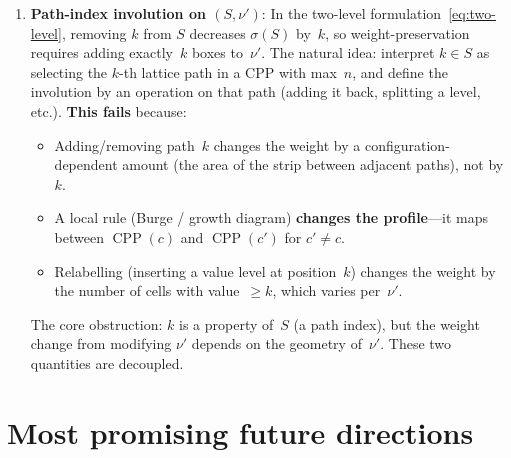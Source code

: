 \documentclass[11pt]{article}
\theoremstyle{plain}
\theoremstyle{definition}
\theoremstyle{remark}
\newcommand{\CPP}{\operatorname{CPP}}
\begin{document}
\begin{enumerate}
\item \textbf{Path-index involution on $(S, \nu')$}:
  In the two-level formulation~\eqref{eq:two-level},
  removing $k$ from $S$ decreases $\sigma(S)$ by~$k$,
  so weight-preservation requires adding exactly~$k$
  boxes to~$\nu'$.
  The natural idea: interpret $k \in S$ as selecting
  the $k$-th lattice path in a CPP with max~$n$, and
  define the involution by an operation on that path
  (adding it back, splitting a level, etc.).
  \textbf{This fails} because:
  \begin{itemize}
    \item Adding/removing path~$k$ changes the weight
      by a configuration-dependent amount (the area of
      the strip between adjacent paths), not by~$k$.
    \item A local rule (Burge / growth diagram)
      \textbf{changes the profile}---it maps between
      $\CPP(c)$ and $\CPP(c')$ for $c' \neq c$.
    \item Relabelling (inserting a value level at
      position~$k$) changes the weight by the number
      of cells with value~$\geq k$, which varies
      per~$\nu'$.
  \end{itemize}
  The core obstruction: $k$ is a property of~$S$
  (a path index), but the weight change from modifying
  $\nu'$ depends on the geometry of~$\nu'$.  These two
  quantities are decoupled.
\end{enumerate}


\section{Most promising future directions}
\label{sec:future-directions}
\end{document}
